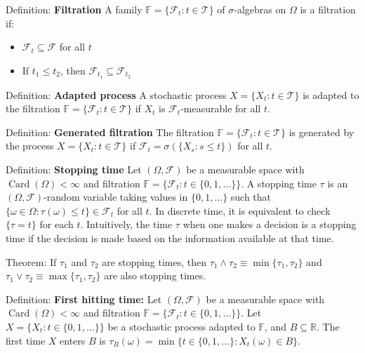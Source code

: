 \documentclass[12pt,a4paper]{article}
\begin{document}
Definition: \textbf{Filtration}
\vspace{0.5em}
A family $\mathbb{F} = \{\mathcal{F}_t : t \in \mathcal{T}\}$ of $\sigma$-algebras on $\Omega$ is a filtration if:
\begin{itemize}
	\item[F1:] $\mathcal{F}_t \subseteq \mathcal{F}$ for all $t$
	\item[F2:] If $t_1 \leq t_2$, then $\mathcal{F}_{t_1} \subseteq \mathcal{F}_{t_2}$
\end{itemize}
\vspace{1em}

Definition: \textbf{Adapted process}
\vspace{0.5em}
A stochastic process $X = \{X_t : t \in \mathcal{T}\}$ is adapted to the filtration $\mathbb{F} = \{\mathcal{F}_t : t \in \mathcal{T}\}$ if $X_t$ is $\mathcal{F}_t$-measurable for all $t$.
\vspace{1em}

Definition: \textbf{Generated filtration}
\vspace{0.5em}
The filtration $\mathbb{F} = \{\mathcal{F}_t : t \in \mathcal{T}\}$ is generated by the process $X = \{X_t : t \in \mathcal{T}\}$ if $\mathcal{F}_t = \sigma(\{X_s : s \leq t\})$ for all $t$.
\vspace{1em}


\vspace{1em}

Definition: \textbf{Stopping time}
\vspace{0.5em}
Let $(\Omega, \mathcal{F})$ be a measurable space with $\operatorname{Card}(\Omega) < \infty$ and filtration $\mathbb{F} = \{\mathcal{F}_t : t \in \{0,1,\ldots\}\}$. A stopping time $\tau$ is an $(\Omega, \mathcal{F})$-random variable taking values in $\{0,1,\ldots\}$ such that $\{\omega \in \Omega : \tau(\omega) \leq t\} \in \mathcal{F}_t$ for all $t$. In discrete time, it is equivalent to check $\{\tau = t\}$ for each $t$.
Intuitively, the time $\tau$ when one makes a decision is a stopping time if the decision is made based on the information available at that time.
\vspace{1em}

Theorem: If $\tau_1$ and $\tau_2$ are stopping times, then $\tau_1 \wedge \tau_2 \equiv \min\{\tau_1, \tau_2\}$ and $\tau_1 \vee \tau_2 \equiv \max\{\tau_1, \tau_2\}$ are also stopping times.
\vspace{1em}

Definition: \textbf{First hitting time:} Let $(\Omega, \mathcal{F})$ be a measurable space with $\operatorname{Card}(\Omega) < \infty$ and filtration $\mathbb{F} = \{\mathcal{F}_t : t \in \{0,1,\ldots\}\}$. Let $X = \{X_t : t \in \{0,1,\ldots\}\}$ be a stochastic process adapted to $\mathbb{F}$, and $B \subseteq \mathbb{R}$. The first time $X$ enters $B$ is
$\tau_B(\omega) = \min\{t \in \{0,1,\ldots\} : X_t(\omega) \in B\}$.
\end{document}
